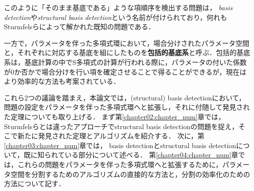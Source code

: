 \par
このように「そのまま\groebner{}基底である」ような項順序を検出する問題は，\emph{\groebner{} basis detection}\cite{gritzmann1993minkowski}や\emph{structural \groebner{} basis detection}\cite{sturmfels1997structural}という名前が付けられており，何れもSturmfelsらによって解かれた既知の問題である．
\par
一方で，パラメータを伴った多項式環において，場合分けされたパラメータ空間と，それぞれに対応する\groebner{}基底を組にしたものを\textbf{包括的\groebner{}基底系}\cite{weispfenning1992comprehensive}と呼ぶ．包括的\groebner{}基底系は，\groebner{}基底計算の中でS多項式の計算が行われる際に，パラメータの付いた係数が$0$か否かで場合分けを行い項を確定させることで得ることができるが，現在はより効率的な方法も考案されている\cite{nabeshima2007speed, kapur2010new}．
\par
これら$2$つの議論を踏まえ，本論文では，(structural) \groebner{} basis detectionにおいて，問題の設定をパラメータを伴った多項式環へと拡張し，それに付随して発見された定理についても取り上げる．
まず第\ref{chapter02:chapter_num}章では，Sturmfelsらとは違ったアプローチでstructural \groebner{} basis detectionの問題を捉え，そこで新たに発見された定理とアルゴリズムを紹介する．
次に，第\ref{chapter03:chapter_num}章では，\groebner{} basis detectionとstructural \groebner{} basis detectionについて，既に知られている部分について述べる．
第\ref{chapter04:chapter_num}章では，これらの問題をパラメータを伴った多項式環へと拡張するために，パラメータ空間を分割するためのアルゴリズムの直接的な方法と，分割の効率化のための方法について記す．